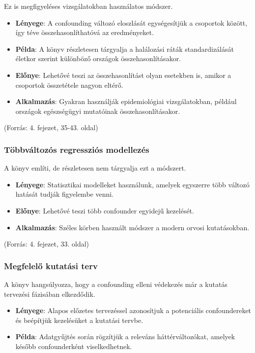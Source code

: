 \documentclass[a4paper,12pt]{article}
\begin{document}
    Ez is megfigyeléses vizsgálatokban használatos módszer.

    \begin{itemize}
        \item \textbf{Lényege}: A confounding változó eloszlását egységesítjük a csoportok között, így téve összehasonlíthatóvá az eredményeket.
        \item \textbf{Példa}: A könyv részletesen tárgyalja a halálozási ráták standardizálását életkor szerint különböző országok összehasonlításakor.
        \item \textbf{Előnye}: Lehetővé teszi az összehasonlítást olyan esetekben is, amikor a csoportok összetétele nagyon eltérő.
        \item \textbf{Alkalmazás}: Gyakran használják epidemiológiai vizsgálatokban, például országok egészségügyi mutatóinak összehasonlításakor.
    \end{itemize}
    (Forrás: 4. fejezet, 35-43. oldal)

    \subsubsection{Többváltozós regressziós modellezés}

    A könyv említi, de részletesen nem tárgyalja ezt a módszert.

    \begin{itemize}
        \item \textbf{Lényege}: Statisztikai modelleket használunk, amelyek egyszerre több változó hatását tudják figyelembe venni.
        \item \textbf{Előnye}: Lehetővé teszi több confounder egyidejű kezelését.
        \item \textbf{Alkalmazás}: Széles körben használt módszer a modern orvosi kutatásokban.
    \end{itemize}

    (Forrás: 4. fejezet, 33. oldal)

    \subsubsection{Megfelelő kutatási terv}

    A könyv hangsúlyozza, hogy a confounding elleni védekezés már a kutatás tervezési fázisában elkezdődik.

    \begin{itemize}
        \item \textbf{Lényege}: Alapos előzetes tervezéssel azonosítjuk a potenciális confoundereket és beépítjük kezelésüket a kutatási tervbe.
        \item \textbf{Példa}: Adatgyűjtés során rögzítjük a releváns háttérváltozókat, amelyek később confounderként viselkedhetnek.
    \end{itemize}
\end{document}
